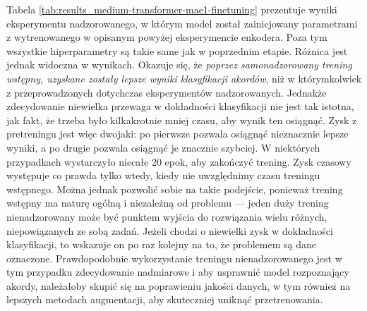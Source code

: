 Tabela \ref{tab:results_medium-transformer-mae1-finetuning} prezentuje wyniki eksperymentu nadzorowanego, w którym model został zainicjowany parametrami z wytrenowanego w opisanym powyżej eksperymencie enkodera. Poza tym wszystkie hiperparametry są takie same jak w poprzednim etapie. Różnica jest jednak widoczna w wynikach. Okazuje się, że \emph{poprzez samonadzorowany trening wstępny, uzyskane zostały lepsze wyniki klasyfikacji akordów}, niż w którymkolwiek z przeprowadzonych dotychczas eksperymentów nadzorowanych. Jednakże zdecydowanie niewielka przewaga w dokładności klasyfikacji nie jest tak istotna, jak fakt, że trzeba było kilkakrotnie mniej czasu, aby wynik ten osiągnąć. Zysk z pretreningu jest więc dwojaki: po pierwsze pozwala osiągnąć nieznacznie lepsze wyniki, a po drugie pozwala osiągnąć je znacznie szybciej. W niektórych przypadkach wystarczyło niecałe $20$ epok, aby zakończyć trening. Zysk czasowy występuje co prawda tylko wtedy, kiedy nie uwzględnimy czasu treningu wstępnego. Można jednak pozwolić sobie na takie podejście, ponieważ trening wstępny ma naturę ogólną i niezależną od problemu --- jeden duży trening nienadzorowany może być punktem wyjścia do rozwiązania wielu różnych, niepowiązanych ze sobą zadań. Jeżeli chodzi o niewielki zysk w dokładności klasyfikacji, to wskazuje on po raz kolejny na to, że problemem są dane oznaczone. Prawdopodobnie wykorzystanie treningu nienadzorowanego jest w tym przypadku zdecydowanie nadmiarowe i aby usprawnić model rozpoznający akordy, należałoby skupić się na poprawieniu jakości danych, w tym również na lepszych metodach augmentacji, aby skuteczniej uniknąć przetrenowania.

